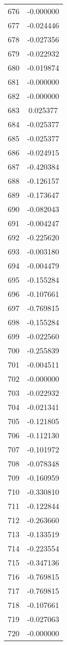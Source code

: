 \documentclass[12pt]{article}
\begin{document}
\begin{longtable}{@{}cc@{}}
676 & -0.000000 \\
677 & -0.024446 \\
678 & -0.027356 \\
679 & -0.022932 \\
680 & -0.019874 \\
681 & -0.000000 \\
682 & -0.000000 \\
683 & 0.025377 \\
684 & -0.025377 \\
685 & -0.025377 \\
686 & -0.024915 \\
687 & -0.420384 \\
688 & -0.126157 \\
689 & -0.173647 \\
690 & -0.082043 \\
691 & -0.004247 \\
692 & -0.225620 \\
693 & -0.003180 \\
694 & -0.004479 \\
695 & -0.155284 \\
696 & -0.107661 \\
697 & -0.769815 \\
698 & -0.155284 \\
699 & -0.022560 \\
700 & -0.255839 \\
701 & -0.004511 \\
702 & -0.000000 \\
703 & -0.022932 \\
704 & -0.021341 \\
705 & -0.121805 \\
706 & -0.112130 \\
707 & -0.101972 \\
708 & -0.078348 \\
709 & -0.160959 \\
710 & -0.330810 \\
711 & -0.122844 \\
712 & -0.263660 \\
713 & -0.133519 \\
714 & -0.223554 \\
715 & -0.347136 \\
716 & -0.769815 \\
717 & -0.769815 \\
718 & -0.107661 \\
719 & -0.027063 \\
720 & -0.000000 \\

\end{longtable}
\end{document}

